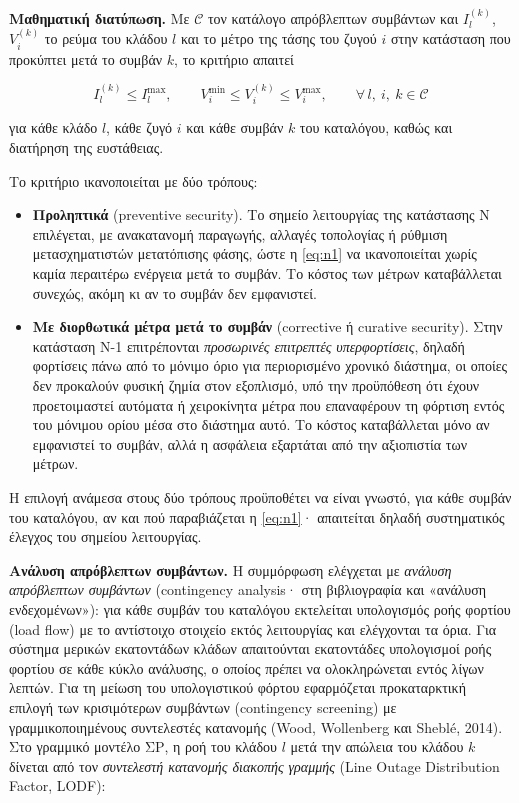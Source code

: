 \textbf{Μαθηματική διατύπωση.} Με $\mathcal{C}$ τον κατάλογο απρόβλεπτων συμβάντων και
$I_l^{(k)}$, $V_i^{(k)}$ το ρεύμα του κλάδου $l$ και το μέτρο της τάσης του ζυγού $i$ στην
κατάσταση που προκύπτει μετά το συμβάν $k$, το κριτήριο απαιτεί

\begin{equation}
I_l^{(k)} \le I_l^{\max}, \qquad V_i^{\min} \le V_i^{(k)} \le V_i^{\max},
\qquad \forall\, l,\ i,\ k \in \mathcal{C}
\label{eq:n1}
\end{equation}

για κάθε κλάδο $l$, κάθε ζυγό $i$ και κάθε συμβάν $k$ του καταλόγου, καθώς και διατήρηση της
ευστάθειας.

Το κριτήριο ικανοποιείται με δύο τρόπους:

\begin{itemize}
\item \textbf{Προληπτικά} (preventive security). Το σημείο λειτουργίας της κατάστασης N
      επιλέγεται, με ανακατανομή παραγωγής, αλλαγές τοπολογίας ή ρύθμιση μετασχηματιστών
      μετατόπισης φάσης, ώστε η \eqref{eq:n1} να ικανοποιείται χωρίς καμία περαιτέρω ενέργεια
      μετά το συμβάν. Το κόστος των μέτρων καταβάλλεται συνεχώς, ακόμη κι αν το συμβάν δεν
      εμφανιστεί.
\item \textbf{Με διορθωτικά μέτρα μετά το συμβάν} (corrective ή curative security). Στην
      κατάσταση N-1 επιτρέπονται \emph{προσωρινές επιτρεπτές υπερφορτίσεις}, δηλαδή φορτίσεις
      πάνω από το μόνιμο όριο για περιορισμένο χρονικό διάστημα, οι οποίες δεν προκαλούν φυσική
      ζημία στον εξοπλισμό, υπό την προϋπόθεση ότι έχουν προετοιμαστεί αυτόματα ή χειροκίνητα
      μέτρα που επαναφέρουν τη φόρτιση εντός του μόνιμου ορίου μέσα στο διάστημα αυτό. Το κόστος
      καταβάλλεται μόνο αν εμφανιστεί το συμβάν, αλλά η ασφάλεια εξαρτάται από την αξιοπιστία των
      μέτρων.
\end{itemize}

Η επιλογή ανάμεσα στους δύο τρόπους προϋποθέτει να είναι γνωστό, για κάθε συμβάν του
καταλόγου, αν και πού παραβιάζεται η \eqref{eq:n1}· απαιτείται δηλαδή συστηματικός έλεγχος του
σημείου λειτουργίας.

\textbf{Ανάλυση απρόβλεπτων συμβάντων.} Η συμμόρφωση ελέγχεται με \emph{ανάλυση απρόβλεπτων
συμβάντων} (contingency analysis· στη βιβλιογραφία και «ανάλυση ενδεχομένων»): για κάθε
συμβάν του καταλόγου εκτελείται υπολογισμός ροής φορτίου (load flow) με το αντίστοιχο
στοιχείο εκτός λειτουργίας και ελέγχονται τα όρια. Για σύστημα μερικών εκατοντάδων κλάδων
απαιτούνται εκατοντάδες υπολογισμοί ροής φορτίου σε κάθε κύκλο ανάλυσης, ο οποίος πρέπει να
ολοκληρώνεται εντός λίγων λεπτών. Για τη μείωση του υπολογιστικού φόρτου εφαρμόζεται
προκαταρκτική επιλογή των κρισιμότερων συμβάντων (contingency screening) με γραμμικοποιημένους
συντελεστές κατανομής (Wood, Wollenberg και Sheblé, 2014). Στο γραμμικό μοντέλο ΣΡ, η ροή του κλάδου $l$ μετά την απώλεια του
κλάδου $k$ δίνεται από τον \emph{συντελεστή κατανομής διακοπής γραμμής} (Line Outage
Distribution Factor, LODF):

